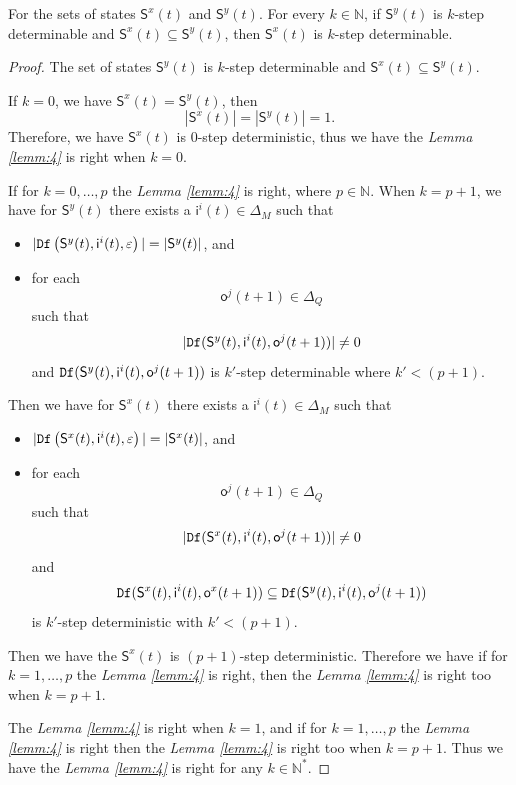\begin{lemma}
For the sets of states $\mathsf{S}^{x}(t)$ and $\mathsf{S}^{y}(t)$. For every $k\in \mathbb{N}$, if $\mathsf{S}^{y}(t)$ is $k$-step determinable and $\mathsf{S}^{x}(t)\subseteq \mathsf{S}^{y}(t)$, then $\mathsf{S}^{x}(t)$ is $k$-step determinable.
  \label{lemm:4}
\end{lemma}
\begin{proof}
The set of states $\mathsf{S}^{y}(t)$ is $k$-step determinable and $\mathsf{S}^{x}(t)\subseteq \mathsf{S}^{y}(t)$. %

If $k=0$, we have $\mathsf{S}^{x}(t) = \mathsf{S}^{y}(t)$, then \[|\mathsf{S}^{x}(t)|=|\mathsf{S}^{y}(t)|=1.\] Therefore, we have $\mathsf{S}^{x}(t)$ is $0$-step deterministic, thus we have the {\em Lemma \ref{lemm:4}} is right when $k=0$.


 
 If for $k=0,\ldots, p$ the {\em Lemma \ref{lemm:4}} is right, where $p\in\mathbb{N}$. When $k=p+1$, we have for $\mathsf{S}^{y}(t)$ there exists a $\mathsf{i}^{i}(t)\in \Delta_M$ such that
 \begin{itemize}
 \item  $|{\tt Df}\left(\mathsf{S}^{y}(t),\mathsf{i}^{i}(t),\varepsilon\right)|=|\mathsf{S}^{y}(t)|$, and 
 \item  for each \[\mathsf{o}^{j}(t+1)\in \Delta_Q\] such that \[|{\tt Df}(\mathsf{S}^{y}(t),\mathsf{i}^{i}(t),\mathsf{o}^{j}(t+1))|\neq 0\] and ${\tt Df}(\mathsf{S}^{y}(t),\mathsf{i}^{i}(t),\mathsf{o}^{j}(t+1))$ is $k'$-step determinable where ${k'}<(p+1)$.
 \end{itemize}
 Then we have for $\mathsf{S}^{x}(t)$ there exists a $\mathsf{i}^{i}(t)\in \Delta_M$ such that
 \begin{itemize}
 \item  $|{\tt Df}\left(\mathsf{S}^{x}(t),\mathsf{i}^{i}(t),\varepsilon\right)|=|\mathsf{S}^{x}(t)|$, and 
 \item  for each \[\mathsf{o}^{j}(t+1)\in \Delta_Q\] such that \[|{\tt Df}(\mathsf{S}^{x}(t),\mathsf{i}^{i}(t),\mathsf{o}^{j}(t+1))|\neq 0\] and \[{\tt Df}(\mathsf{S}^{x}(t),\mathsf{i}^{i}(t),\mathsf{o}^{x}(t+1))\subseteq {\tt Df}(\mathsf{S}^{y}(t),\mathsf{i}^{i}(t),\mathsf{o}^{j}(t+1))\] is  $k'$-step deterministic with  ${k'}<(p+1)$.
 \end{itemize}  Then we have the $\mathsf{S}^{x}(t)$ is $(p+1)$-step deterministic. Therefore we have if for $k=1,\ldots, p$ the {\em Lemma \ref{lemm:4}} is right, then the {\em Lemma \ref{lemm:4}} is right too when $k=p+1$. 

The {\em Lemma \ref{lemm:4}} is right when $k=1$, and if for $k=1,\ldots, p$ the {\em Lemma \ref{lemm:4}} is right then the {\em Lemma \ref{lemm:4}} is right too when $k=p+1$. Thus we have the {\em Lemma \ref{lemm:4}} is right for any $k\in \mathbb{N}^*$.
 
\end{proof}


